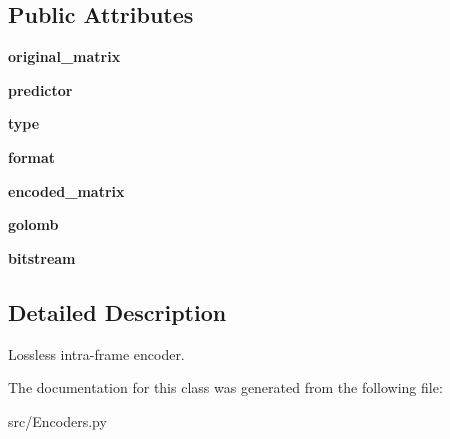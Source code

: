 \subsection*{Public Attributes}
\begin{DoxyCompactItemize}
\item 
\mbox{\label{classEncoders_1_1IntraFrameEncoder_a4c39d89ab2becf4759a63377f26dde34}} 
{\bfseries original\+\_\+matrix}
\item 
\mbox{\label{classEncoders_1_1IntraFrameEncoder_a0d8d65d5fbec7a1668ffa3b53651c434}} 
{\bfseries predictor}
\item 
\mbox{\label{classEncoders_1_1IntraFrameEncoder_a44712819cca0007e60d36224cca20ba0}} 
{\bfseries type}
\item 
\mbox{\label{classEncoders_1_1IntraFrameEncoder_a2d6db067a2f0fffb532d211c71081a9d}} 
{\bfseries format}
\item 
\mbox{\label{classEncoders_1_1IntraFrameEncoder_a6f076a1914f037382a5ba86428007f02}} 
{\bfseries encoded\+\_\+matrix}
\item 
\mbox{\label{classEncoders_1_1IntraFrameEncoder_a4968ac15ac7e096322569f9045368232}} 
{\bfseries golomb}
\item 
\mbox{\label{classEncoders_1_1IntraFrameEncoder_a98405d1d6189c27b8ab06292a60d0fc4}} 
{\bfseries bitstream}
\end{DoxyCompactItemize}


\subsection{Detailed Description}
\begin{DoxyVerb}Lossless intra-frame encoder.
\end{DoxyVerb}
 

The documentation for this class was generated from the following file\+:\begin{DoxyCompactItemize}
\item 
src/Encoders.\+py\end{DoxyCompactItemize}
